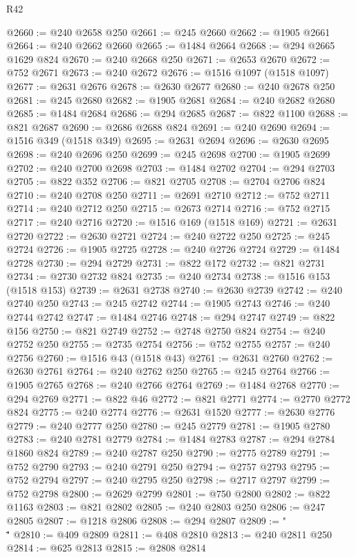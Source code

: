 \begin{lexlean}{R42}
\begin{coremodule}
{@2660 := @240 @2658 @250
@2661 := @245 @2660
@2662 := @1905 @2661
@2664 := @240 @2662 @2660
@2665 := @1484 @2664
@2668 := @294 @2665 @1629 @824
@2670 := @240 @2668 @250
@2671 := @2653 @2670
@2672 := @752 @2671
@2673 := @240 @2672
@2676 := @1516 @1097 (@1518 @1097)
@2677 := @2631 @2676
@2678 := @2630 @2677
@2680 := @240 @2678 @250
@2681 := @245 @2680
@2682 := @1905 @2681
@2684 := @240 @2682 @2680
@2685 := @1484 @2684
@2686 := @294 @2685
@2687 := @822 @1100
@2688 := @821 @2687
@2690 := @2686 @2688 @824
@2691 := @240 @2690
@2694 := @1516 @349 (@1518 @349)
@2695 := @2631 @2694
@2696 := @2630 @2695
@2698 := @240 @2696 @250
@2699 := @245 @2698
@2700 := @1905 @2699
@2702 := @240 @2700 @2698
@2703 := @1484 @2702
@2704 := @294 @2703
@2705 := @822 @352
@2706 := @821 @2705
@2708 := @2704 @2706 @824
@2710 := @240 @2708 @250
@2711 := @2691 @2710
@2712 := @752 @2711
@2714 := @240 @2712 @250
@2715 := @2673 @2714
@2716 := @752 @2715
@2717 := @240 @2716
@2720 := @1516 @169 (@1518 @169)
@2721 := @2631 @2720
@2722 := @2630 @2721
@2724 := @240 @2722 @250
@2725 := @245 @2724
@2726 := @1905 @2725
@2728 := @240 @2726 @2724
@2729 := @1484 @2728
@2730 := @294 @2729
@2731 := @822 @172
@2732 := @821 @2731
@2734 := @2730 @2732 @824
@2735 := @240 @2734
@2738 := @1516 @153 (@1518 @153)
@2739 := @2631 @2738
@2740 := @2630 @2739
@2742 := @240 @2740 @250
@2743 := @245 @2742
@2744 := @1905 @2743
@2746 := @240 @2744 @2742
@2747 := @1484 @2746
@2748 := @294 @2747
@2749 := @822 @156
@2750 := @821 @2749
@2752 := @2748 @2750 @824
@2754 := @240 @2752 @250
@2755 := @2735 @2754
@2756 := @752 @2755
@2757 := @240 @2756
@2760 := @1516 @43 (@1518 @43)
@2761 := @2631 @2760
@2762 := @2630 @2761
@2764 := @240 @2762 @250
@2765 := @245 @2764
@2766 := @1905 @2765
@2768 := @240 @2766 @2764
@2769 := @1484 @2768
@2770 := @294 @2769
@2771 := @822 @46
@2772 := @821 @2771
@2774 := @2770 @2772 @824
@2775 := @240 @2774
@2776 := @2631 @1520
@2777 := @2630 @2776
@2779 := @240 @2777 @250
@2780 := @245 @2779
@2781 := @1905 @2780
@2783 := @240 @2781 @2779
@2784 := @1484 @2783
@2787 := @294 @2784 @1860 @824
@2789 := @240 @2787 @250
@2790 := @2775 @2789
@2791 := @752 @2790
@2793 := @240 @2791 @250
@2794 := @2757 @2793
@2795 := @752 @2794
@2797 := @240 @2795 @250
@2798 := @2717 @2797
@2799 := @752 @2798
@2800 := @2629 @2799
@2801 := @750 @2800
@2802 := @822 @1163
@2803 := @821 @2802
@2805 := @240 @2803 @250
@2806 := @247 @2805
@2807 := @1218 @2806
@2808 := @294 @2807
@2809 := "\\\""
@2810 := @409 @2809
@2811 := @408 @2810
@2813 := @240 @2811 @250
@2814 := @625 @2813
@2815 := @2808 @2814
}
\end{coremodule}
\end{lexlean}
